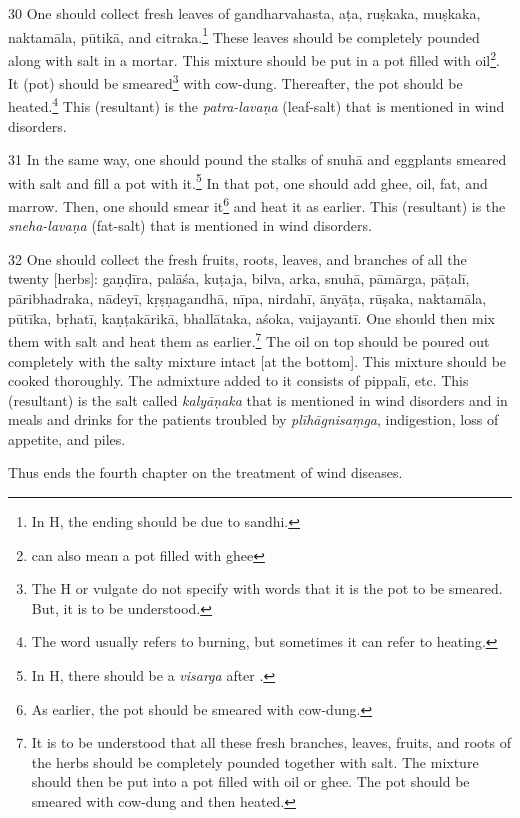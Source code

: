 \begin{translation}
\begin{tt}
    \item[30]
    One should collect fresh leaves of \gls{gandharvahasta}, \gls{aṭa}, 
    \gls{ruṣkaka}, \gls{muṣkaka}, \gls{naktamāla}, \gls{pūtikā}, and 
    \gls{citraka}.\footnote{In H, the ending  should be  
    due to sandhi.} These leaves should be completely pounded along with salt 
    in a mortar. This mixture should be put in a pot filled with 
    oil\footnote{ can also mean a pot filled with ghee}. It 
    (pot) should be smeared\footnote{The H or vulgate do not specify with 
    words that it is the pot to be smeared. But, it is to be understood.} with 
    cow-dung. Thereafter, the pot should be heated.\footnote{The word 
     usually refers to burning, but sometimes it can refer to 
    heating.} This (resultant) is the \textit{patra-lavaṇa} (leaf-salt) that is 
    mentioned in wind disorders. 

    \item[31]
    In the same way, one should pound the stalks of \gls{snuhā} and eggplants smeared with salt and fill a pot 
    with it.\footnote{In H, there should be a \textit{visarga} after 
    .} In that pot, one should add ghee, oil, fat, and marrow. Then, 
    one should smear it\footnote{As earlier, the pot should be smeared with 
    cow-dung.} and heat it as earlier. This (resultant) is the 
    \textit{sneha-lavaṇa} (fat-salt) that is mentioned in wind disorders.

    \item[32]
    One should collect the fresh fruits, roots, leaves, and branches of all the 
    twenty [herbs]: \gls{gaṇḍīra}, \gls{palāśa}, \gls{kuṭaja}, \gls{bilva}, 
    \gls{arka}, \gls{snuhā}, \gls{pāmārga}, \gls{pāṭalī}, \gls{pāribhadraka}, 
    \gls{nādeyī}, \gls{kṛṣṇagandhā}, \gls{nīpa}, \gls{nirdahī}, \gls{ānyāṭa}, 
    \gls{rūṣaka}, \gls{naktamāla}, \gls{pūtīka}, \gls{bṛhatī}, \gls{kaṇṭakārikā}, 
    \gls{bhallātaka}, \gls{aśoka}, \gls{vaijayantī}. One should then mix them 
    with salt and heat them as earlier.\footnote{It is to be understood that all 
    these fresh branches, leaves, fruits, and roots of the herbs should be 
    completely pounded together with salt. The mixture should then be put into 
    a pot filled with oil or ghee. The pot should be smeared with cow-dung and 
    then heated.} The oil on top should be poured out completely with the salty 
    mixture intact [at the bottom]. This mixture should be cooked thoroughly. 
    The admixture added to it consists of \gls{pippalī}, etc. This (resultant) is 
    the salt called \textit{kalyāṇaka} that is mentioned in wind disorders and in 
    meals and drinks for the patients troubled by \textit{plīhāgnisaṃga}, 
    indigestion, loss of appetite, and piles.


    Thus ends the fourth chapter on the treatment of wind diseases. 

\end{tt}    

\end{translation}
